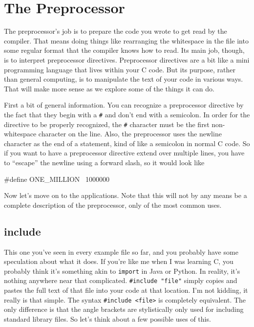 \documentclass[ebook,11pt,oneside,openany]{memoir}
\newcommand{\cf}[1]{\texttt{#1}}
\begin{document}
\section{The Preprocessor}
\label{ch:pre}

The preprocessor's job is to prepare the code you wrote to get read by the compiler. That means doing things like rearranging the whitespace in the file into some regular format that the compiler knows how to read. Its main job, though, is to interpret preprocessor directives. Preprocessor directives are a bit like a mini programming language that lives within your C code. But its purpose, rather than general computing, is to manipulate the text of your code in various ways. That will make more sense as we explore some of the things it can do.

First a bit of general information. You can recognize a preprocessor directive by the fact that they begin with a \cf{\#} and don't end with a semicolon. In order for the directive to be properly recognized, the \cf{\#} character must be the first non-whitespace character on the line. Also, the preprocessor uses the newline character as the end of a statement, kind of like a semicolon in normal C code. So if you want to have a preprocessor directive extend over multiple lines, you have to ``escape'' the newline using a forward slash, so it would look like 

\begin{code}[language=C]
#define ONE_MILLION \
  1000000
\end{code}

Now let's move on to the applications. Note that this will not by any means be a complete description of the preprocessor, only of the most common uses.
\subsection{include}

This one you've seen in every example file so far, and you probably have some speculation about what it does. If you're like me when I was learning C, you probably think it's something akin to \cf{import} in Java or Python. In reality, it's nothing anywhere near that complicated. \cf{\#include "file"} simply copies and pastes the full text of that file into your code at that location. I'm not kidding, it really is that simple. The syntax \cf{\#include <file>} is completely equivalent. The only difference is that the angle brackets are stylistically only used for including standard library files. So let's think about a few possible uses of this. 
\end{document}
